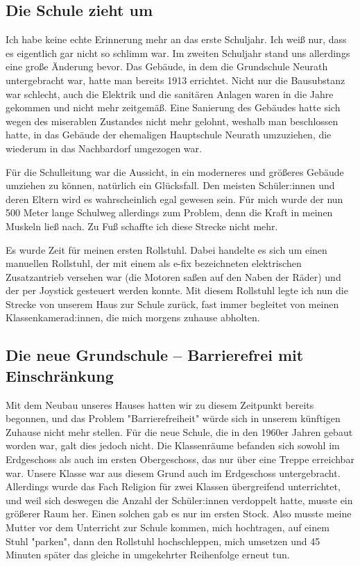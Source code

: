 \documentclass[fontsize=14pt,a4paper,headinclude,DIV=calc,automark]{scrbook}
\begin{document}
\subsection{Die Schule zieht um}

Ich habe keine echte Erinnerung mehr an das erste Schuljahr. Ich weiß nur, dass es eigentlich gar nicht so schlimm war. Im zweiten Schuljahr stand uns allerdings eine große Änderung bevor. Das Gebäude, in dem die Grundschule Neurath untergebracht war, hatte man bereits 1913 errichtet. Nicht nur die Bausubstanz war schlecht, auch die Elektrik und die sanitären Anlagen waren in die Jahre gekommen und nicht mehr zeitgemäß. Eine Sanierung des Gebäudes hatte sich wegen des miserablen Zustandes nicht mehr gelohnt, weshalb man beschlossen hatte, in das Gebäude der ehemaligen Hauptschule Neurath umzuziehen, die wiederum in das Nachbardorf umgezogen war.

Für die Schulleitung war die Aussicht, in ein moderneres und größeres Gebäude umziehen zu können, natürlich ein Glücksfall. Den meisten Schüler:innen und deren Eltern wird es wahrscheinlich egal gewesen sein. Für mich wurde der nun 500 Meter lange Schulweg allerdings zum Problem, denn die Kraft in meinen Muskeln ließ nach. Zu Fuß schaffte ich diese Strecke nicht mehr.

Es wurde Zeit für meinen ersten Rollstuhl. Dabei handelte es sich um einen manuellen Rollstuhl, der mit einem als e-fix bezeichneten elektrischen Zusatzantrieb versehen war (die Motoren saßen auf den Naben der Räder) und der per Joystick gesteuert werden konnte. Mit diesem Rollstuhl legte ich nun die Strecke von unserem Haus zur Schule zurück, fast immer begleitet von meinen Klassenkamerad:innen, die mich morgens zuhause abholten.

\subsection{Die neue Grundschule – Barrierefrei mit Einschränkung}

Mit dem Neubau unseres Hauses hatten wir zu diesem Zeitpunkt bereits begonnen, und das Problem "Barrierefreiheit" würde sich in unserem künftigen Zuhause nicht mehr stellen. Für die neue Schule, die in den 1960er Jahren gebaut worden war, galt dies jedoch nicht. Die Klassenräume befanden sich sowohl im Erdgeschoss als auch im ersten Obergeschoss, das nur über eine Treppe erreichbar war. Unsere Klasse war aus diesem Grund auch im Erdgeschoss untergebracht. Allerdings wurde das Fach Religion für zwei Klassen übergreifend unterrichtet, und weil sich deswegen die Anzahl der Schüler:innen verdoppelt hatte, musste ein größerer Raum her. Einen solchen gab es nur im ersten Stock. Also musste meine Mutter vor dem Unterricht zur Schule kommen, mich hochtragen, auf einem Stuhl "parken", dann den Rollstuhl hochschleppen, mich umsetzen und 45 Minuten später das gleiche in umgekehrter Reihenfolge erneut tun.
\end{document}
